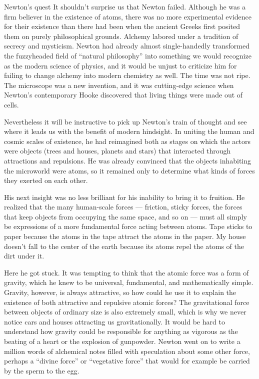 \begin{envsubsection}{Newton's quest}
	It shouldn't surprise us that Newton failed. Although he
	was a firm believer in the existence of atoms, there was no
	more experimental evidence for their existence than there
	had been when the ancient Greeks first posited them on
	purely philosophical grounds. Alchemy labored
	under a tradition of secrecy and mysticism. Newton had
	already almost single-handedly transformed the fuzzyheaded
	field of ``natural philosophy'' into something we would
	recognize as the modern science of physics, and it would be
	unjust to criticize him for failing to change alchemy into
	modern chemistry as well. The time was not ripe. The
	microscope was a new invention, and it was cutting-edge
	science when Newton's contemporary Hooke
	discovered that living things were made out of cells.

	Nevertheless it will be instructive to pick up Newton's
	train of thought and see where it leads us with the benefit
	of modern hindsight. In uniting the human and cosmic scales
	of existence, he had reimagined both as stages on which the
	actors were objects (trees and houses, planets and stars)
	that interacted through attractions and repulsions. He was
	already convinced that the objects inhabiting the microworld
	were atoms, so it remained only to determine what kinds of
	forces they exerted on each other.

	His next insight was no less brilliant for his inability to
	bring it to fruition. He realized that the many human-scale
	forces --- friction, sticky forces, the forces that
	keep objects from occupying the same space, and so on ---
	must all simply be expressions of a more fundamental force
	acting between atoms. Tape sticks to paper because the atoms
	in the tape attract the atoms in the paper. My house doesn't
	fall to the center of the earth because its atoms repel the
	atoms of the dirt under it.

	Here he got stuck. It was tempting to think that the atomic
	force was a form of gravity, which he knew to be universal,
	fundamental, and mathematically simple. Gravity, however, is
	always attractive, so how could he use it to explain the
	existence of both attractive and repulsive atomic forces?
	The gravitational force between objects of ordinary size is
	also extremely small, which is why we never notice cars and
	houses attracting us gravitationally. It would be hard to
	understand how gravity could be responsible for anything as
	vigorous as the beating of a heart or the explosion of
	gunpowder. Newton went on to write a million words of
	alchemical notes filled with speculation about some other
	force, perhaps a ``divine force'' or ``vegetative force''
	that would for example be carried by the sperm to the egg.


\end{envsubsection}
